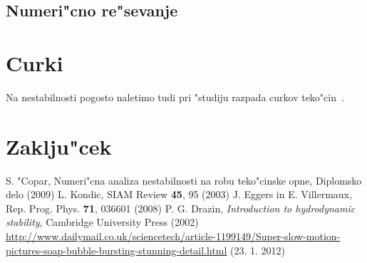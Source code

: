 \documentclass[a4paper,10pt]{article}
\begin{document}
\subsection{Numeri"cno re"sevanje}

\section{Curki}

Na nestabilnosti pogosto naletimo tudi pri "studiju razpada curkov teko"cin~\cite{eggers}. 


\section{Zaklju"cek}

\begin{thebibliography}{3}
   S. "Copar, Numeri"cna analiza nestabilnosti na robu teko"cinske opne, Diplomsko delo (2009)
   L. Kondic, SIAM Review \textbf{45}, 95 (2003)
   J. Eggers in E. Villermaux, Rep. Prog. Phys. \textbf{71}, 036601 (2008)
   P. G. Drazin, \textit{Introduction to hydrodynamic stability}, Cambridge University Press (2002)
   \url{http://www.dailymail.co.uk/sciencetech/article-1199149/Super-slow-motion-pictures-soap-bubble-bursting-stunning-detail.html} (23. 1. 2012)
\end{thebibliography}
\end{document}
